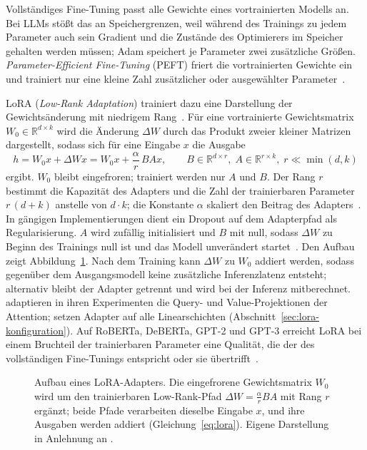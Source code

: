 Vollständiges Fine-Tuning passt alle Gewichte eines vortrainierten
Modells an.
Bei LLMs stößt das an Speichergrenzen, weil während des Trainings zu
jedem Parameter auch sein Gradient und die Zustände des Optimierers
im Speicher gehalten werden müssen; Adam speichert je Parameter zwei zusätzliche Größen.
\emph{Parameter-Efficient Fine-Tuning} (PEFT) friert die vortrainierten
Gewichte ein und trainiert nur eine kleine Zahl zusätzlicher
oder ausgewählter Parameter~\cite{han2024parameter}.

LoRA (\emph{Low-Rank Adaptation}) trainiert dazu eine
Darstellung der Gewichtsänderung mit niedrigem
Rang~\cite{hu2021lora}.
Für eine vortrainierte Gewichtsmatrix $W_0 \in \mathbb{R}^{d \times k}$
wird die Änderung $\Delta W$ durch das Produkt zweier kleiner Matrizen
dargestellt, sodass sich für eine Eingabe $x$ die Ausgabe
\begin{equation}
  h = W_0 x + \Delta W x = W_0 x + \frac{\alpha}{r}\, B A x,
  \qquad B \in \mathbb{R}^{d \times r},\;
  A \in \mathbb{R}^{r \times k},\;
  r \ll \min(d, k)
  \label{eq:lora}
\end{equation}
ergibt.
$W_0$ bleibt eingefroren; trainiert werden nur $A$ und $B$.
Der Rang $r$ bestimmt die Kapazität des Adapters und die Zahl der
trainierbaren Parameter $r\,(d + k)$ anstelle von $d \cdot k$; die
Konstante $\alpha$ skaliert den Beitrag des
Adapters~\cite[Abschn.~4.1]{hu2021lora}.
In gängigen Implementierungen dient ein Dropout auf dem Adapterpfad als
Regularisierung.
$A$ wird zufällig initialisiert und $B$ mit null, sodass $\Delta W$ zu
Beginn des Trainings null ist und das Modell unverändert
startet~\cite{hu2021lora}.
Den Aufbau zeigt Abbildung~\ref{fig:lora-adapter}.
Nach dem Training kann $\Delta W$ zu $W_0$ addiert werden, sodass
gegenüber dem Ausgangsmodell keine zusätzliche Inferenzlatenz entsteht;
alternativ bleibt der Adapter getrennt und wird bei der Inferenz
mitberechnet.
\textcite{hu2021lora} adaptieren in ihren Experimenten die Query- und
Value-Projektionen der Attention; \textcite{dettmers2023qlora} setzen
Adapter auf alle Linearschichten
(Abschnitt~\ref{sec:lora-konfiguration}).
Auf RoBERTa, DeBERTa, GPT-2 und GPT-3 erreicht LoRA bei einem Bruchteil
der trainierbaren Parameter eine Qualität, die der des vollständigen
Fine-Tunings entspricht oder sie übertrifft~\cite{hu2021lora}.

\begin{figure}[htbp]
  \centering
  
  \caption[Aufbau eines LoRA-Adapters]{Aufbau eines LoRA-Adapters.
  Die eingefrorene Gewichtsmatrix $W_0$ wird um den trainierbaren
  Low-Rank-Pfad $\Delta W = \tfrac{\alpha}{r} BA$ mit Rang $r$ ergänzt; beide Pfade
  verarbeiten dieselbe Eingabe $x$, und ihre Ausgaben werden addiert
  (Gleichung~\ref{eq:lora}).
  Eigene Darstellung in Anlehnung an \textcite[Abb.~1]{hu2021lora}.}
  \label{fig:lora-adapter}
\end{figure}


